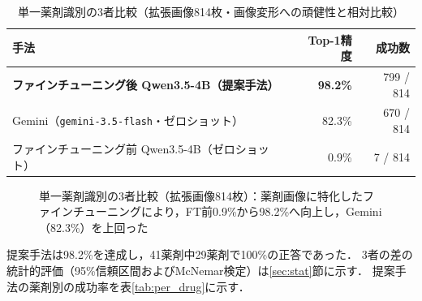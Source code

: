 \documentclass[dvipdfmx]{jsarticle}
\begin{document}
\begin{table}[htbp]
\centering
\caption{単一薬剤識別の3者比較（拡張画像814枚・画像変形への頑健性と相対比較）}
\label{tab:single_compare}
\begin{tabular}{lrr}
\hline
手法 & Top-1精度 & 成功数 \\
\hline
\textbf{ファインチューニング後 Qwen3.5-4B（提案手法）} & \textbf{98.2\%} & 799 / 814 \\
Gemini（\texttt{gemini-3.5-flash}・ゼロショット） & 82.3\% & 670 / 814 \\
ファインチューニング前 Qwen3.5-4B（ゼロショット） & 0.9\% & 7 / 814 \\
\hline
\end{tabular}
\end{table}

\begin{figure}[htbp]
\centering
{}
\caption{単一薬剤識別の3者比較（拡張画像814枚）：薬剤画像に特化したファインチューニングにより，FT前0.9\%から98.2\%へ向上し，Gemini（82.3\%）を上回った}
\label{fig:single_bar}
\end{figure}

提案手法は98.2\%を達成し，41薬剤中29薬剤で100\%の正答であった．
3者の差の統計的評価（95\%信頼区間およびMcNemar検定）は\ref{sec:stat}節に示す．
提案手法の薬剤別の成功率を表\ref{tab:per_drug}に示す．
\end{document}

